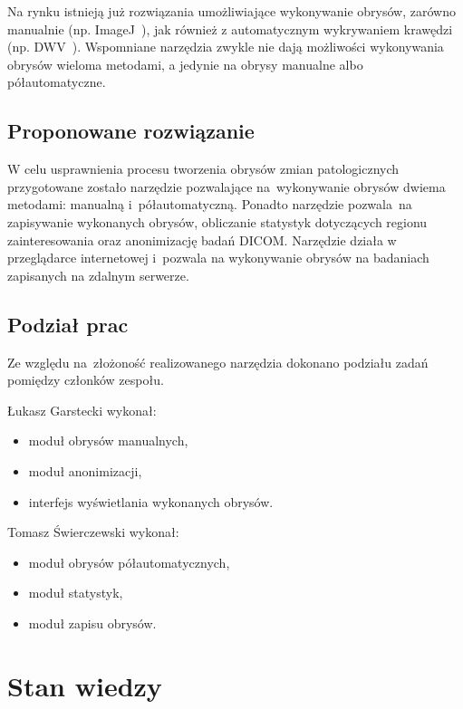 \documentclass[a4paper,11pt,twoside,openright]{report}
\newcommand\blankpage{%
    \null
    \thispagestyle{empty}%
    \newpage}
\theoremstyle{definition}
\begin{document}
Na rynku istnieją już rozwiązania umożliwiające wykonywanie obrysów,
zarówno manualnie (np. ImageJ~\cite{ImageJ}), jak również z automatycznym wykrywaniem krawędzi (np. DWV~\cite{DWV}).
Wspomniane narzędzia zwykle nie dają możliwości wykonywania obrysów wieloma metodami,
a jedynie na obrysy manualne albo półautomatyczne.

\section {Proponowane rozwiązanie}

W celu usprawnienia procesu tworzenia obrysów zmian patologicznych przygotowane
zostało narzędzie pozwalające na~wykonywanie obrysów dwiema metodami:
manualną i~półautomatyczną. Ponadto narzędzie pozwala~na zapisywanie wykonanych obrysów,
obliczanie statystyk dotyczących regionu zainteresowania oraz anonimizację badań DICOM.
Narzędzie działa w przeglądarce internetowej i~pozwala na wykonywanie obrysów na badaniach
zapisanych na zdalnym serwerze.
\pagebreak

\section {Podział prac}

Ze względu na~złożoność realizowanego narzędzia dokonano podziału zadań pomiędzy
członków zespołu.

Łukasz Garstecki wykonał:

\begin{itemize}[noitemsep]
	\item moduł obrysów manualnych,
	\item moduł anonimizacji,
	\item interfejs wyświetlania wykonanych obrysów.
\end{itemize}

Tomasz Świerczewski wykonał:

\begin{itemize}[noitemsep]
\item moduł obrysów półautomatycznych,
\item moduł statystyk,
\item moduł zapisu obrysów.
\end{itemize}

\afterpage{\blankpage}

\chapter {Stan wiedzy}
\end{document}
